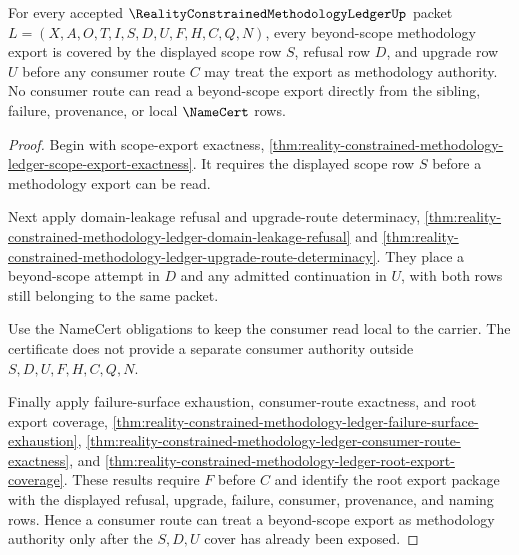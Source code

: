 \begin{theorem}
\label{thm:reality-constrained-methodology-ledger-scope-refusal-cover}
For every accepted $\RealityConstrainedMethodologyLedgerUp$ packet
$L=(X,A,O,T,I,S,D,U,F,H,C,Q,N)$, every beyond-scope methodology export is
covered by the displayed scope row $S$, refusal row $D$, and upgrade row $U$
before any consumer route $C$ may treat the export as methodology authority.
No consumer route can read a beyond-scope export directly from the sibling,
failure, provenance, or local $\NameCert$ rows.
\end{theorem}
\begin{proof}
Begin with scope-export exactness,
\autoref{thm:reality-constrained-methodology-ledger-scope-export-exactness}.
It requires the displayed scope row $S$ before a methodology export can be
read.

Next apply domain-leakage refusal and upgrade-route determinacy,
\autoref{thm:reality-constrained-methodology-ledger-domain-leakage-refusal}
and
\autoref{thm:reality-constrained-methodology-ledger-upgrade-route-determinacy}.
They place a beyond-scope attempt in $D$ and any admitted continuation in $U$,
with both rows still belonging to the same packet.

Use the NameCert obligations to keep the consumer read local to the carrier.
The certificate does not provide a separate consumer authority outside
$S,D,U,F,H,C,Q,N$.

Finally apply failure-surface exhaustion, consumer-route exactness, and root
export coverage,
\autoref{thm:reality-constrained-methodology-ledger-failure-surface-exhaustion},
\autoref{thm:reality-constrained-methodology-ledger-consumer-route-exactness},
and
\autoref{thm:reality-constrained-methodology-ledger-root-export-coverage}.
These results require $F$ before $C$ and identify the root export package with
the displayed refusal, upgrade, failure, consumer, provenance, and naming rows.
Hence a consumer route can treat a beyond-scope export as methodology authority
only after the $S,D,U$ cover has already been exposed.
\end{proof}

